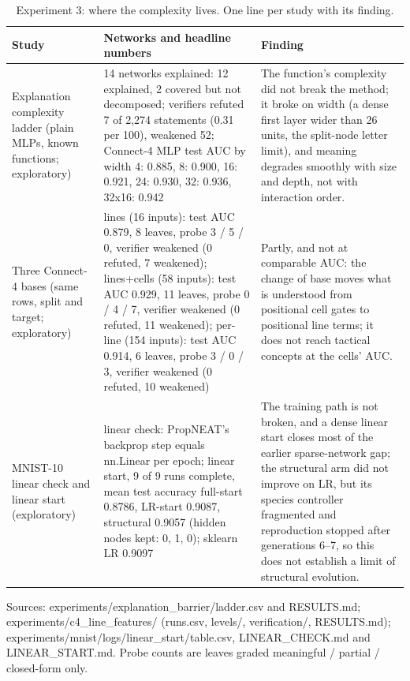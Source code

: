 \begin{table}[htbp]
\centering
\small
\caption{Experiment 3: where the complexity lives. One line per study with its finding.}
\label{tab:ch7-exp3-complexity}
\begin{tabular}{p{3.6cm}p{6.2cm}p{5.4cm}}
\toprule
Study & Networks and headline numbers & Finding \\
\midrule
Explanation complexity ladder (plain MLPs, known functions; exploratory) & 14 networks explained: 12 explained, 2 covered but not decomposed; verifiers refuted 7 of 2,274 statements (0.31 per 100), weakened 52; Connect-4 MLP test AUC by width 4: 0.885, 8: 0.900, 16: 0.921, 24: 0.930, 32: 0.936, 32x16: 0.942 & The function's complexity did not break the method; it broke on width (a dense first layer wider than 26 units, the split-node letter limit), and meaning degrades smoothly with size and depth, not with interaction order. \\
Three Connect-4 bases (same rows, split and target; exploratory) & lines (16 inputs): test AUC 0.879, 8 leaves, probe 3 / 5 / 0, verifier weakened (0 refuted, 7 weakened); lines+cells (58 inputs): test AUC 0.929, 11 leaves, probe 0 / 4 / 7, verifier weakened (0 refuted, 11 weakened); per-line (154 inputs): test AUC 0.914, 6 leaves, probe 3 / 0 / 3, verifier weakened (0 refuted, 10 weakened) & Partly, and not at comparable AUC: the change of base moves what is understood from positional cell gates to positional line terms; it does not reach tactical concepts at the cells' AUC. \\
MNIST-10 linear check and linear start (exploratory) & linear check: PropNEAT's backprop step equals nn.Linear per epoch; linear start, 9 of 9 runs complete, mean test accuracy full-start 0.8786, LR-start 0.9087, structural 0.9057 (hidden nodes kept: 0, 1, 0); sklearn LR 0.9097 & The training path is not broken, and a dense linear start closes most of the earlier sparse-network gap; the structural arm did not improve on LR, but its species controller fragmented and reproduction stopped after generations 6--7, so this does not establish a limit of structural evolution. \\
\bottomrule
\end{tabular}
\begin{flushleft}\footnotesize Sources: experiments/explanation\_barrier/ladder.csv and RESULTS.md; experiments/c4\_line\_features/ (runs.csv, levels/, verification/, RESULTS.md); experiments/mnist/logs/linear\_start/table.csv, LINEAR\_CHECK.md and LINEAR\_START.md. Probe counts are leaves graded meaningful / partial / closed-form only.\end{flushleft}
\end{table}
